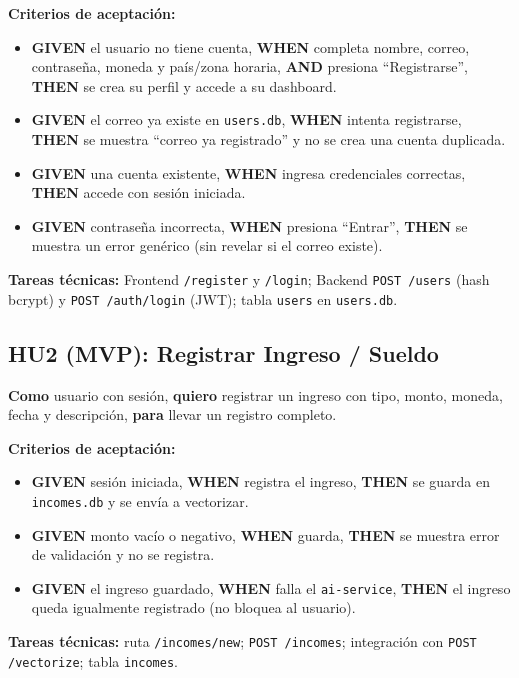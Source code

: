 \documentclass[12pt,letterpaper]{article}
\begin{document}
\textbf{Criterios de aceptaci\'on:}
\begin{itemize}[leftmargin=1.2cm]
  \item \textbf{GIVEN} el usuario no tiene cuenta, \textbf{WHEN} completa nombre,
        correo, contrase\~na, moneda y pa\'is/zona horaria, \textbf{AND} presiona
        ``Registrarse'', \textbf{THEN} se crea su perfil y accede a su dashboard.
  \item \textbf{GIVEN} el correo ya existe en \texttt{users.db}, \textbf{WHEN}
        intenta registrarse, \textbf{THEN} se muestra ``correo ya registrado'' y no
        se crea una cuenta duplicada.
  \item \textbf{GIVEN} una cuenta existente, \textbf{WHEN} ingresa credenciales
        correctas, \textbf{THEN} accede con sesi\'on iniciada.
  \item \textbf{GIVEN} contrase\~na incorrecta, \textbf{WHEN} presiona ``Entrar'',
        \textbf{THEN} se muestra un error gen\'erico (sin revelar si el correo existe).
\end{itemize}
\textbf{Tareas t\'ecnicas:} Frontend \texttt{/register} y \texttt{/login}; Backend
\texttt{POST /users} (hash bcrypt) y \texttt{POST /auth/login} (JWT); tabla
\texttt{users} en \texttt{users.db}.

\subsection{HU2 (MVP): Registrar Ingreso / Sueldo}
\textbf{Como} usuario con sesi\'on, \textbf{quiero} registrar un ingreso con tipo,
monto, moneda, fecha y descripci\'on, \textbf{para} llevar un registro completo.

\textbf{Criterios de aceptaci\'on:}
\begin{itemize}[leftmargin=1.2cm]
  \item \textbf{GIVEN} sesi\'on iniciada, \textbf{WHEN} registra el ingreso,
        \textbf{THEN} se guarda en \texttt{incomes.db} y se env\'ia a vectorizar.
  \item \textbf{GIVEN} monto vac\'io o negativo, \textbf{WHEN} guarda, \textbf{THEN}
        se muestra error de validaci\'on y no se registra.
  \item \textbf{GIVEN} el ingreso guardado, \textbf{WHEN} falla el \texttt{ai-service},
        \textbf{THEN} el ingreso queda igualmente registrado (no bloquea al usuario).
\end{itemize}
\textbf{Tareas t\'ecnicas:} ruta \texttt{/incomes/new}; \texttt{POST /incomes};
integraci\'on con \texttt{POST /vectorize}; tabla \texttt{incomes}.
\end{document}
